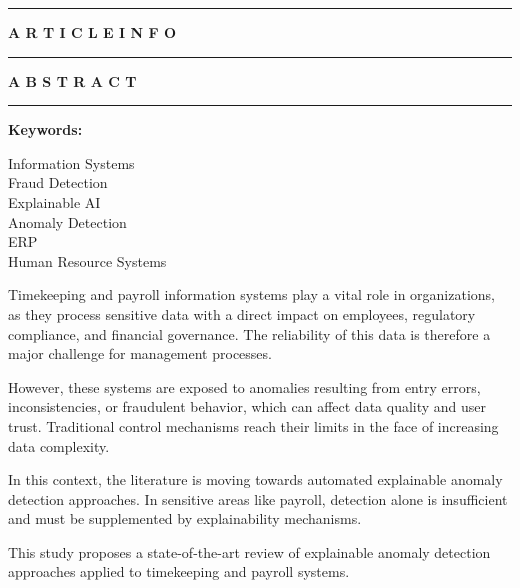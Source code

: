 \documentclass[10pt]{article}
\begin{document}
\vspace{0.4cm}
{\color{journalblue}\hrule}
\vspace{0.4cm}


\begin{minipage}[t]{0.22\textwidth}
\centering
{\color{journalblue}\textbf{A R T I C L E \quad I N F O}}

\vspace{0.1cm}
{\color{journalblue}\rule{\linewidth}{0.6pt}}
\end{minipage}
\hfill
\begin{minipage}[t]{0.73\textwidth}
{\color{journalblue}\textbf{A B S T R A C T}}

\vspace{0.1cm}
{\color{journalblue}\rule{\linewidth}{0.6pt}}
\end{minipage}

\vspace{0.5cm}

\color{black}

\begin{minipage}[t]{0.24\textwidth}
{\color{journalblue}
\textbf{Keywords:}

\vspace{0.3cm}

Information Systems\\
Fraud Detection\\
Explainable AI\\
Anomaly Detection\\
ERP\\
Human Resource Systems

\vspace{0.8cm}
}
\end{minipage}
\hfill
\begin{minipage}[t]{0.74\textwidth}
{\color{journalblue}
Timekeeping and payroll information systems play a vital role in organizations, as they process sensitive data with a direct impact on employees, regulatory compliance, and financial governance. The reliability of this data is therefore a major challenge for management processes.

However, these systems are exposed to anomalies resulting from entry errors, inconsistencies, or fraudulent behavior, which can affect data quality and user trust. Traditional control mechanisms reach their limits in the face of increasing data complexity.

In this context, the literature is moving towards automated explainable anomaly detection approaches. In sensitive areas like payroll, detection alone is insufficient and must be supplemented by explainability mechanisms.

This study proposes a state-of-the-art review of explainable anomaly detection approaches applied to timekeeping and payroll systems.
}
\end{minipage}
\end{document}
